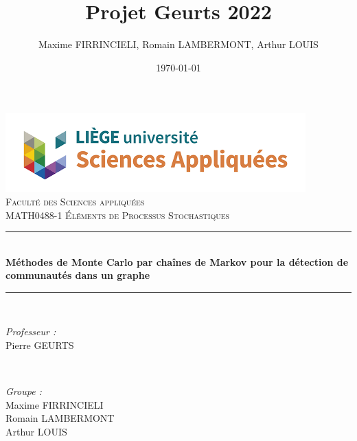 \documentclass{article}
\begin{document}

\title{Projet Geurts 2022}								%
\author{Maxime FIRRINCIELI, Romain LAMBERMONT, Arthur LOUIS}								%
\date{\today}											%

\makeatletter
\let\thetitle\@title
\let\theauthor\@author
\let\thedate\@date
\makeatother

\pagestyle{fancy}
\fancyhf{}
\rhead{\theauthor}
\lhead{\thetitle}
\cfoot{\thepage}

\begin{titlepage}
 \centering
 \vspace*{0.5 cm}
 \includegraphics[scale = 0.7]{figs/facsa.png}\\[1.0 cm]	%
 \textsc{\LARGE \newline\newline Faculté des Sciences appliquées}\\[2.0 cm]	%
 \textsc{\Large MATH0488-1 Éléments de Processus Stochastiques}\\[0.5 cm]				%
 \rule{\linewidth}{0.2 mm} \\[0.4 cm]
 {\huge \bfseries Méthodes de Monte Carlo par chaînes de Markov pour la détection de communautés dans un graphe}\\
 \rule{\linewidth}{0.2 mm} \\[1.5 cm]

 \begin{minipage}{0.5\textwidth}
 	\begin{flushleft} \large
 		\emph{Professeur :}\\
 		  Pierre GEURTS\\
    \vspace{0.5cm}
 		\end{flushleft}
 		\end{minipage}~
 		\begin{minipage}{0.4\textwidth}

 		\begin{flushright} \large
 		\emph{Groupe :} \\
      Maxime FIRRINCIELI\\
      Romain LAMBERMONT\\
      Arthur LOUIS\\
 	\end{flushright}

 \end{minipage}\\[2 cm]


 \thedate
\end{titlepage}
\end{document}
